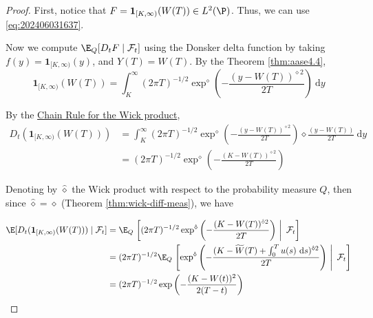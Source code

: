 \begin{proof}
First, notice that $F = \mathbf{1}_{[K, \infty)}(W(T)) \in L^2(\P)$. Thus, we can use \eqref{eq:202406031637}.

Now we compute $\E_Q [D_t F \mid \mathcal{F}_t]$ using the Donsker delta function by taking $f(y) = \mathbf{1}_{[K, \infty)}(y)$, and $Y(T) = W(T)$. By the Theorem \ref{thm:aase4.4},
\[
\mathbf{1}_{[K, \infty)}(W(T)) = \int_K^\infty (2 \pi T)^{-1/2} \exp^\diamond \left( - \frac{(y-W(T))^{\diamond 2}}{2T} \right) ~\mathrm{d}y
\]

By the \hyperref[thm:wick-chain]{Chain Rule for the Wick product}, 
\begin{equation*}
\begin{aligned}
D_t (\mathbf{1}_{[K, \infty)}(W(T))) &= \int_K^\infty (2 \pi T)^{-1/2} \exp^\diamond \left( - \frac{(y-W(T))^{\diamond 2}}{2T} \right) \diamond \frac{(y-W(T))}{2T} ~\mathrm{d}y \\ 
&= (2 \pi T)^{-1/2} \exp^\diamond \left( - \frac{(K-W(T))^{\diamond 2}}{2T} \right)
\end{aligned}
\end{equation*}

Denoting by $\hat{\diamond}$ the Wick product with respect to the probability measure $Q$, then since $\hat{\diamond} = \diamond$ (Theorem \ref{thm:wick-diff-meas}), we have

\begin{equation*}
\begin{aligned}
\E [D_t (\mathbf{1}_{[K, \infty)}(W(T))) \mid \mathcal{F}_t] &= \E_Q \left.\left[ (2\pi T)^{-1/2} \exp^{\hat{\diamond}} \left(- \frac{(K-W(T))^{\hat{\diamond} 2}}{2T} \right) ~ \right| ~ \mathcal{F}_t \right] \\
&= (2\pi T)^{-1/2} \E_Q \left.\left[ \exp^{\hat{\diamond}} \left(- \frac{(K-\widetilde{W}(T) + \int_0^T u(s) ~\mathrm{d}s)^{\hat{\diamond} 2}}{2T} \right) ~ \right| ~ \mathcal{F}_t \right] \\
&= (2\pi T)^{-1/2} \exp \left( - \frac{(K-W(t))^2}{2 (T-t)} \right)
\end{aligned}
\end{equation*}

\end{proof}

